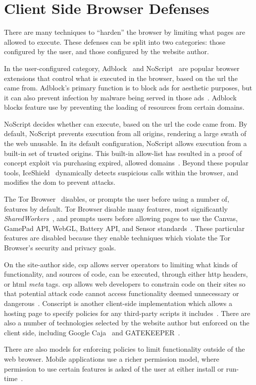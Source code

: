 \section{Client Side Browser Defenses}
\label{background:related-browser-defs}

There are many techniques to ``harden'' the browser by limiting what \JS pages
are allowed to execute. These defenses can be split into two categories: those
configured by the user, and those configured by the website author.

In the user-configured category, Adblock~\cite{adblockplus} and
NoScript~\cite{noscriptwebsite} are popular browser
extensions that control what \JS is executed in the browser, based on the
\gls{url} the \JS came from.  Adblock's primary
function is to block ads for aesthetic purposes, but it can also prevent
infection by malware being served in those
ads~\cite{forbes-malware,engadget-malware}.  Adblock blocks feature use by
preventing the loading of resources from certain domains.

NoScript decides whether \JS can execute, based on the \gls{url} the code came
from.  By default, NoScript prevents \JS execution from all origins, rendering
a large swath of the web unusable.  In its default configuration, NoScript
allows \JS execution from a built-in set of trusted origins.  This built-in
allow-list has resulted in a proof of concept exploit via purchasing expired,
allowed domains~\cite{noscript_whitelist}.  Beyond these popular tools,
IceShield~\cite{heiderich2011iceshield} dynamically detects suspicious \JS
calls within the browser, and modifies the \gls{dom} to prevent attacks.

The Tor Browser~\cite{dingledine2004tor} disables, or prompts the user before
using a number of, features by default.  Tor Browser disable many \JS features,
most significantly \textit{SharedWorkers}~\cite{webworkersw3c}, and prompts
users before allowing pages to use the Canvas, GamePad API, WebGL, Battery API,
and Sensor standards~\cite{tor-features}.  These particular features are
disabled because they enable techniques which violate the Tor Browser's
security and privacy goals.

On the site-author side, \gls{csp} allows server operators to limiting what
kinds of \JS functionality, and sources of code, can be executed, through
either \gls{http} headers, or \gls{html} \textit{meta} tags.
\gls{csp} allows web developers to constrain code on their
sites so that potential attack code cannot access functionality deemed
unnecessary or dangerous~\cite{stamm2010reining}.  Conscript is another
client-side implementation which allows a hosting page to specify policies for
any third-party scripts it includes~\cite{meyerovich2010conscript}.  There are
also a number of technologies selected by the website author but enforced on
the client side,  including Google Caja~\cite{google13caja} and
GATEKEEPER~\cite{guarnieri09gatekeeper}.

There are also models for enforcing policies to limit functionality outside
of the web browser.  Mobile applications use a richer permission model,
where permission to use certain features is asked of the user at either install
or run-time~\cite{android-permissions,au2011short}.
